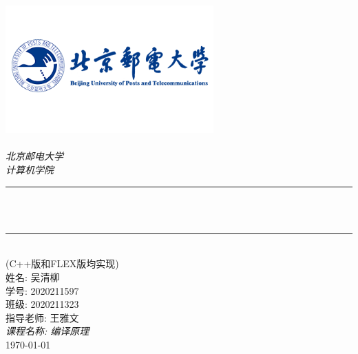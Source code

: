 \begin{titlepage}
    \newcommand{\HRule}{\rule{\linewidth}{0.5mm}}
    \includegraphics[width=8cm]{title/logo_bupt.png}\\[1cm]
    \center
    \quad\\[1.5cm]
    \textsl{\Large 北京邮电大学}\\[0.5cm]
    \textsl{\large  计算机学院}\\[0.5cm]
    \makeatletter
    \HRule \\[0.4cm]
    {\huge \bfseries \@title}\\[0.4cm]
    \HRule \\[1.5cm]
    \makeatother
    {\large (C++版和FLEX版均实现)}\\[0.5cm]
    {\large 姓名: 吴清柳}\\[0.5cm]
    {\large 学号: 2020211597}\\[0.5cm]
    {\large 班级: 2020211323}\\[0.5cm]
    {\large 指导老师: 王雅文}\\[0.5cm]
    {\large \emph{课程名称: 编译原理}}\\[0.5cm]
    {\large \today}\\[2cm]
    \vfill
\end{titlepage}
